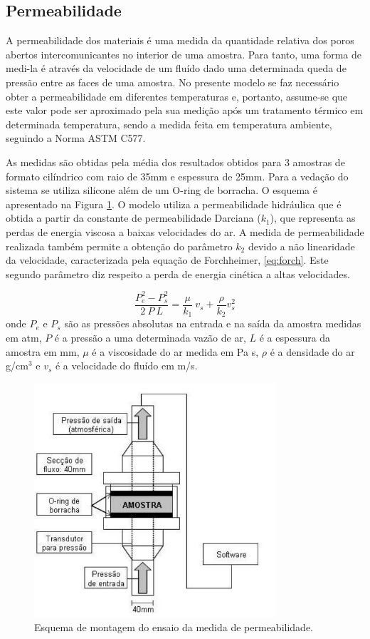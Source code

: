 \subsection{Permeabilidade}\label{mat:perm}

A permeabilidade dos materiais é uma medida da quantidade relativa dos poros
abertos intercomunicantes no interior de uma amostra. Para tanto, uma forma de
medi-la é através da velocidade de um fluído dado uma determinada queda de
pressão entre as faces de uma amostra. No presente modelo se faz necessário
obter a permeabilidade em diferentes temperaturas e, portanto, assume-se que
este valor pode ser aproximado pela sua medição após um
tratamento térmico em determinada temperatura, sendo a medida feita em
temperatura ambiente, seguindo a Norma ASTM C577.

As medidas são obtidas pela média dos resultados obtidos para 3 amostras de
formato cilíndrico com raio de 35mm e espessura de 25mm. Para a vedação do
sistema se utiliza silicone além de um O-ring de borracha. O esquema é
apresentado na Figura \ref{fig:perm}. O modelo utiliza a permeabilidade
hidráulica que é obtida a partir da constante de permeabilidade Darciana
($k_1$), que representa as perdas de energia viscosa a baixas velocidades do ar.
A medida de permeabilidade realizada também permite a obtenção do parâmetro
$k_2$ devido a não linearidade da velocidade, caracterizada pela equação de
Forchheimer, \ref{eq:forch}. Este segundo parâmetro diz respeito a perda de
energia cinética a altas velocidades.

\begin{equation}
  \label{eq:forch}
  \frac{P_e^2 - P_s^2}{2 \ P \ L} = \frac{\mu}{k_1} \ v_s + \frac{\rho}{k_2}v_s^2
\end{equation}
onde $P_e$ e $P_s$ são as pressões absolutas na entrada e na saída da amostra
medidas em atm, $P$ é a pressão a uma determinada vazão de ar, $L$ é a espessura
da amostra em mm, $\mu$ é a viscosidade do ar medida em Pa s, $\rho$ é a
densidade do ar g/cm$^3$ e $v_s$ é a velocidade do fluído em m/s.

\begin{figure}[ht]
	\centering
	\includegraphics[width=9cm]{./figures/perm.pdf}
	\caption{Esquema de montagem do ensaio da medida de
    permeabilidade. \label{fig:perm}}
\end{figure}

